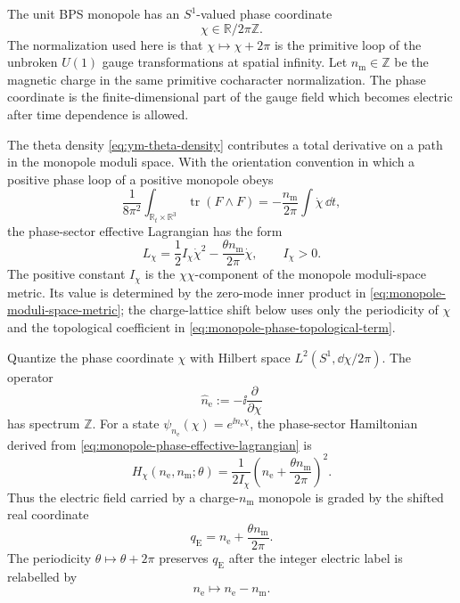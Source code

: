 The unit BPS monopole has an \(S^1\)-valued phase coordinate
\[
  \chi\in \mathbb R/2\pi\mathbb Z .
\]
The normalization used here is that \(\chi\mapsto\chi+2\pi\) is the primitive
loop of the unbroken \(U(1)\) gauge transformations at spatial infinity.  Let
\(n_{\mathrm m}\in\mathbb Z\) be the magnetic charge in the same primitive
cocharacter normalization.  The phase coordinate is the finite-dimensional
part of the gauge field which becomes electric after time dependence is
allowed.

The theta density \eqref{eq:ym-theta-density} contributes a total derivative
on a path in the monopole moduli space.  With the orientation convention in
which a positive phase loop of a positive monopole obeys
\begin{equation}
  \frac{1}{8\pi^2}
  \int_{\mathbb R_t\times\mathbb R^3}
  \operatorname{tr}(F\wedge F)
  =
  -\frac{n_{\mathrm m}}{2\pi}
  \int \dot\chi\,\dd t ,
  \label{eq:monopole-phase-topological-term}
\end{equation}
the phase-sector effective Lagrangian has the form
\begin{equation}
  L_\chi
  =
  \frac12 I_\chi\dot\chi^2
  -
  \frac{\theta n_{\mathrm m}}{2\pi}\dot\chi ,
  \qquad I_\chi>0 .
  \label{eq:monopole-phase-effective-lagrangian}
\end{equation}
The positive constant \(I_\chi\) is the \(\chi\chi\)-component of the monopole
moduli-space metric.  Its value is determined by the zero-mode inner product
in \eqref{eq:monopole-moduli-space-metric}; the charge-lattice shift below
uses only the periodicity of \(\chi\) and the topological coefficient in
\eqref{eq:monopole-phase-topological-term}.

\begin{proposition}
\label{prop:monopole-phase-dyonic-tower-witten-effect}
Quantize the phase coordinate \(\chi\) with Hilbert space
\(L^2(S^1,\dd\chi/2\pi)\).  The operator
\[
  \widehat n_{\mathrm e}:=-\ii\frac{\partial}{\partial\chi}
\]
has spectrum \(\mathbb Z\).  For a state
\(\psi_{n_{\mathrm e}}(\chi)=e^{\ii n_{\mathrm e}\chi}\), the phase-sector
Hamiltonian derived from
\eqref{eq:monopole-phase-effective-lagrangian} is
\begin{equation}
  H_\chi(n_{\mathrm e},n_{\mathrm m};\theta)
  =
  \frac{1}{2I_\chi}
  \left(
    n_{\mathrm e}
    +
    \frac{\theta n_{\mathrm m}}{2\pi}
  \right)^2 .
  \label{eq:monopole-phase-dyon-hamiltonian}
\end{equation}
Thus the electric field carried by a charge-\(n_{\mathrm m}\) monopole is
graded by the shifted real coordinate
\begin{equation}
  q_{\mathrm E}
  =
  n_{\mathrm e}
  +
  \frac{\theta n_{\mathrm m}}{2\pi}.
  \label{eq:witten-effect-shifted-electric-coordinate}
\end{equation}
The periodicity \(\theta\mapsto\theta+2\pi\) preserves \(q_{\mathrm E}\) after
the integer electric label is relabelled by
\begin{equation}
  n_{\mathrm e}\longmapsto n_{\mathrm e}-n_{\mathrm m}.
  \label{eq:witten-effect-charge-relabeling}
\end{equation}
\end{proposition}

